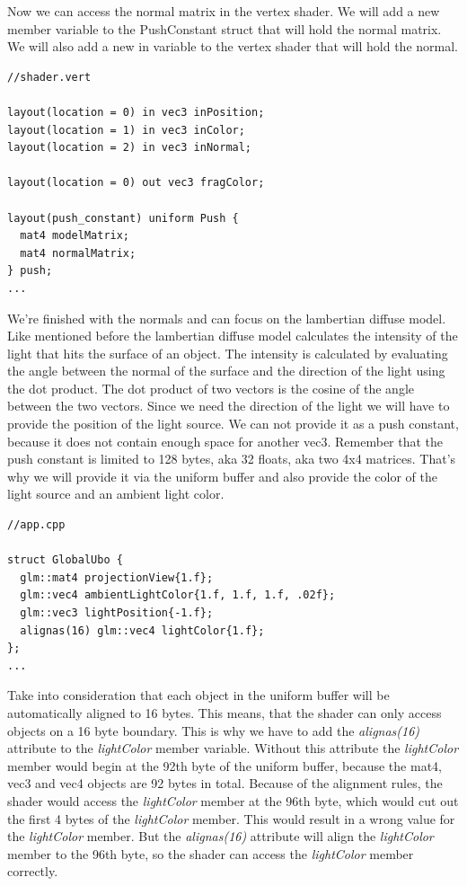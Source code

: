 \documentclass[12pt]{report} \usepackage{preamble}
\begin{document}
Now we can access the normal matrix in the vertex shader. We will add a new member variable to the PushConstant struct that will hold the normal matrix.
We will also add a new in variable to the vertex shader that will hold the normal.

\begin{lstlisting}[Language=C++]
//shader.vert

layout(location = 0) in vec3 inPosition;
layout(location = 1) in vec3 inColor;
layout(location = 2) in vec3 inNormal;

layout(location = 0) out vec3 fragColor;

layout(push_constant) uniform Push {
  mat4 modelMatrix;
  mat4 normalMatrix;
} push;
...
\end{lstlisting}

We're finished with the normals and can focus on the lambertian diffuse model.
Like mentioned before the lambertian diffuse model calculates the intensity of the light that hits the surface of an object.
The intensity is calculated by evaluating the angle between the normal of the surface and the direction of the light using the dot product.
The dot product of two vectors is the cosine of the angle between the two vectors.
Since we need the direction of the light we will have to provide the position of the light source.
We can not provide it as a push constant, because it does not contain enough space for another vec3.
Remember that the push constant is limited to 128 bytes, aka 32 floats, aka two 4x4 matrices.
That's why we will provide it via the uniform buffer and also provide the color of the light source and an ambient light color.

\begin{lstlisting}[Language=C++]
//app.cpp

struct GlobalUbo {
  glm::mat4 projectionView{1.f};
  glm::vec4 ambientLightColor{1.f, 1.f, 1.f, .02f};
  glm::vec3 lightPosition{-1.f};
  alignas(16) glm::vec4 lightColor{1.f};
};
...
\end{lstlisting}

Take into consideration that each object in the uniform buffer will be automatically aligned to 16 bytes. This means, that
the shader can only access objects on a 16 byte boundary. This is why we have to add the \textit{alignas(16)} attribute to the \textit{lightColor} member variable.
Without this attribute the \textit{lightColor} member would begin at the 92th byte of the uniform buffer, because the mat4, vec3 and vec4 objects are 92 bytes in total.
Because of the alignment rules, the shader would access the \textit{lightColor} member at the 96th byte, which would cut out the first 4 bytes of the \textit{lightColor} member.
This would result in a wrong value for the \textit{lightColor} member.
But the \textit{alignas(16)} attribute will align the \textit{lightColor} member to the 96th byte, so the shader can access the \textit{lightColor} member correctly.
\end{document}
